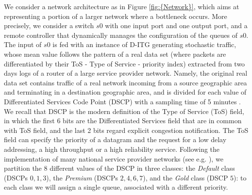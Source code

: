 We consider a network architecture as in Figure \ref{fig:{Network}}, which aims at representing a portion of a larger network where a bottleneck occurs. More precisely, we consider a switch $s0$ with one input port and one output port, and a remote controller \cite{OVS, RYU} that dynamically manages the configuration of the queues of $s0$. The input of $s0$ is fed with an instance of D-ITG generating stochastic traffic, whose mean value follows the pattern of a real data set (where packets are differentiated by their ToS - Type of Service - priority index) extracted from two days logs of a router of a large service provider network. Namely, the original real data set contains traffic of a real network incoming from a source geographic area and terminating in a destination geographic area, and is divided for each value of Differentiated Services Code Point (DSCP) with a sampling time of 5 minutes \cite{Baker1998, Babiarz2006}. We recall that DSCP is the modern definition of the Type of Service (ToS) field, in which the first 6 bits are the Differentiated Services field that are in common with ToS field, and the last 2 bits regard explicit congestion notification. The ToS field can specify the priority of a datagram and the request for a low delay addressing, a high throughput or a high reliability service. Following the implementation of many national service provider networks (see e.g. \cite{Notiziario}), we partition the 8 different values of the DSCP in three classes: the \textit{Default} class (DSCPs $0,1,3$), the \textit{Premium} (DSCPs $2,4,6,7$), and the \textit{Gold} class (DSCP $5$): to each class we will assign a single queue, associated with a different priority.



